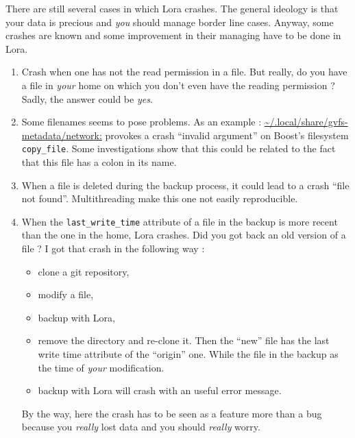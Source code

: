 \documentclass[a4paper,12pt]{article}
\newcommand{\info}[1]{\texttt{#1}}
\begin{document}
There are still several cases in which Lora crashes. The general ideology is that your data is precious and \emph{you} should manage border line cases. Anyway, some crashes are known and some improvement in their managing have to be done in Lora.
\begin{enumerate}
    \item
        Crash when one has not the read permission in a file. But really, do you have a file in \emph{your} home on which you don't even have the reading permission ? Sadly, the answer could be \emph{yes}.
    \item
        Some filenames seems to pose problems. As an example : \url{~/.local/share/gvfs-metadata/network:} provokes a crash ``invalid argument'' on Boost's filesystem \info{copy\_file}. Some investigations show that this could be related to the fact that this file has a colon in its name.
    \item
        When a file is deleted during the backup process, it could lead to a crash ``file not found''. Multithreading make this one not easily reproducible.
    \item
        When the \info{last\_write\_time} attribute of a file in the backup is more recent than the one in the home, Lora crashes. Did you got back an old version of a file ? I got that crash in the following way :
        \begin{itemize}
            \item clone a git repository,
            \item modify a file,
            \item backup with Lora,
            \item remove the directory and re-clone it. Then the ``new'' file has the last write time attribute of the ``origin'' one. While the file in the backup as the time of \emph{your} modification.
            \item backup with Lora will crash with an useful error message.
        \end{itemize}
        By the way, here the crash has to be seen as a feature more than a bug because you \emph{really} lost data and you should \emph{really} worry.
\end{enumerate}
\end{document}
